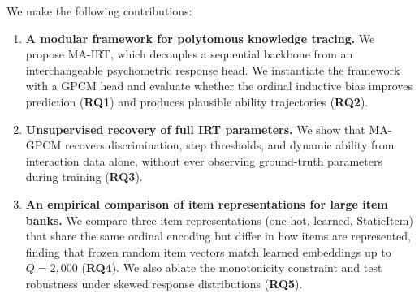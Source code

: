 \documentclass[pdflatex,sn-apa]{sn-jnl}
\begin{document}


We make the following contributions:
\begin{enumerate}
    \item \textbf{A modular framework for polytomous knowledge tracing.} We propose MA-IRT, which decouples a sequential backbone from an interchangeable psychometric response head. We instantiate the framework with a GPCM head and evaluate whether the ordinal inductive bias improves prediction (\textbf{RQ1}) and produces plausible ability trajectories (\textbf{RQ2}).
    \item \textbf{Unsupervised recovery of full IRT parameters.} We show that MA-GPCM recovers discrimination, step thresholds, and dynamic ability from interaction data alone, without ever observing ground-truth parameters during training (\textbf{RQ3}).
    \item \textbf{An empirical comparison of item representations for large item banks.} We compare three item representations (one-hot, learned, StaticItem) that share the same ordinal encoding but differ in how items are represented, finding that frozen random item vectors match learned embeddings up to $Q=2{,}000$ (\textbf{RQ4}). We also ablate the monotonicity constraint and test robustness under skewed response distributions (\textbf{RQ5}).
\end{enumerate}
\end{document}
